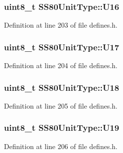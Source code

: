 \subsubsection[{\texorpdfstring{U16}{U16}}]{\setlength{\rightskip}{0pt plus 5cm}uint8\+\_\+t S\+S80\+Unit\+Type\+::\+U16}\hypertarget{structSS80UnitType_a5087f957d0901655950d803a5a644000}{}\label{structSS80UnitType_a5087f957d0901655950d803a5a644000}


Definition at line 203 of file defines.\+h.

\subsubsection[{\texorpdfstring{U17}{U17}}]{\setlength{\rightskip}{0pt plus 5cm}uint8\+\_\+t S\+S80\+Unit\+Type\+::\+U17}\hypertarget{structSS80UnitType_aaf021fbac23492c976d5982acafbc221}{}\label{structSS80UnitType_aaf021fbac23492c976d5982acafbc221}


Definition at line 204 of file defines.\+h.

\subsubsection[{\texorpdfstring{U18}{U18}}]{\setlength{\rightskip}{0pt plus 5cm}uint8\+\_\+t S\+S80\+Unit\+Type\+::\+U18}\hypertarget{structSS80UnitType_ac3edc72ab1fe21eacc43fc09152d5910}{}\label{structSS80UnitType_ac3edc72ab1fe21eacc43fc09152d5910}


Definition at line 205 of file defines.\+h.

\subsubsection[{\texorpdfstring{U19}{U19}}]{\setlength{\rightskip}{0pt plus 5cm}uint8\+\_\+t S\+S80\+Unit\+Type\+::\+U19}\hypertarget{structSS80UnitType_a60163b28ab07a19d2cdd464d5298b425}{}\label{structSS80UnitType_a60163b28ab07a19d2cdd464d5298b425}


Definition at line 206 of file defines.\+h.

